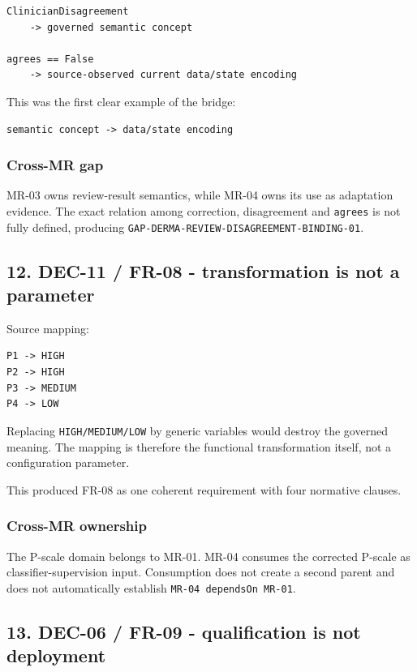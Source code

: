 \documentclass[11pt,a4paper]{article}
\begin{document}
\begin{verbatim}
ClinicianDisagreement
    -> governed semantic concept

agrees == False
    -> source-observed current data/state encoding
\end{verbatim}

This was the first clear example of the bridge:

\begin{verbatim}
semantic concept -> data/state encoding
\end{verbatim}

\subsubsection{Cross-MR gap}\label{cross-mr-gap}

MR-03 owns review-result semantics, while MR-04 owns its use as
adaptation evidence. The exact relation among correction, disagreement
and \texttt{agrees} is not fully defined, producing
\texttt{GAP-DERMA-REVIEW-DISAGREEMENT-BINDING-01}.

\subsection{12. DEC-11 / FR-08 - transformation is not a
parameter}\label{12-dec-11--fr-08---transformation-is-not-a-parameter}

Source mapping:

\begin{verbatim}
P1 -> HIGH
P2 -> HIGH
P3 -> MEDIUM
P4 -> LOW
\end{verbatim}

Replacing \texttt{HIGH/MEDIUM/LOW} by generic variables would destroy
the governed meaning. The mapping is therefore the functional
transformation itself, not a configuration parameter.

This produced FR-08 as one coherent requirement with four normative
clauses.

\subsubsection{Cross-MR ownership}\label{cross-mr-ownership}

The P-scale domain belongs to MR-01. MR-04 consumes the corrected
P-scale as classifier-supervision input. Consumption does not create a
second parent and does not automatically establish
\texttt{MR-04\ dependsOn\ MR-01}.

\subsection{13. DEC-06 / FR-09 - qualification is not
deployment}\label{13-dec-06--fr-09---qualification-is-not-deployment}
\end{document}
